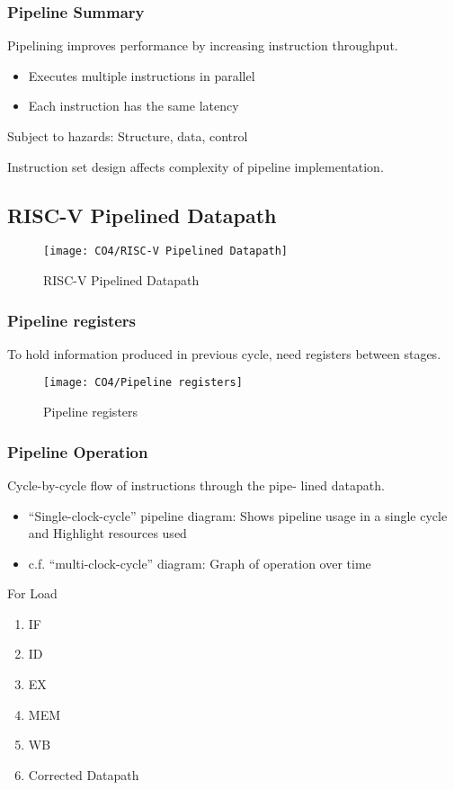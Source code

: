 \subsubsection{Pipeline Summary}
Pipelining improves performance by increasing instruction throughput. 
\begin{itemize}
    \item Executes multiple instructions in parallel
    \item Each instruction has the same latency
\end{itemize}
Subject to hazards: Structure, data, control

Instruction set design affects complexity of pipeline implementation. 

\subsection{RISC-V Pipelined Datapath}

\begin{figure}[!htb]
    \centering
    \texttt{[image: CO4/RISC-V Pipelined Datapath]}
    \caption{RISC-V Pipelined Datapath}
\end{figure}

\subsubsection{Pipeline registers}
To hold information produced in previous cycle,  need registers between stages. 

\begin{figure}[!htb]
    \centering
    \texttt{[image: CO4/Pipeline registers]}
    \caption{Pipeline registers}
\end{figure}

\subsubsection{Pipeline Operation}
Cycle-by-cycle flow of instructions through the pipe- lined datapath. 
\begin{itemize}\small
    \item  ``Single-clock-cycle'' pipeline diagram: Shows pipeline usage in a single cycle and Highlight resources used
    \item c.f. “multi-clock-cycle” diagram: Graph of operation over time
\end{itemize}

For Load
\begin{enumerate}\small
    \item IF
    \item ID
    \item EX 
    \item MEM
    \item WB
    \item Corrected Datapath
\end{enumerate}

